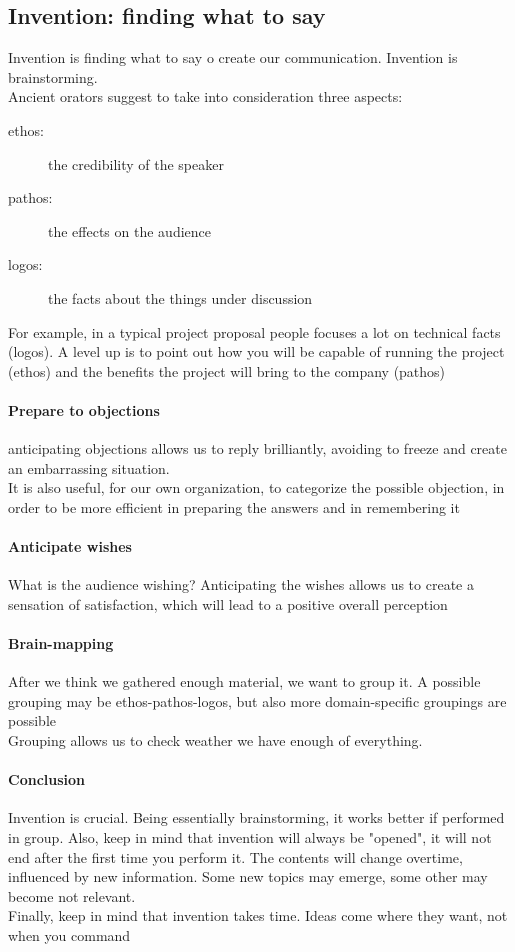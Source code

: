 \documentclass{article}
\begin{document}
\subsection{Invention: finding what to say}
Invention is finding what to say o create our communication. Invention is brainstorming.\\
Ancient orators suggest to take into consideration three aspects:
\begin{description}
\item[ethos:] the credibility of the speaker
\item[pathos:] the effects on the audience
\item[logos:] the facts about the things under discussion
\end{description}
For example, in a typical project proposal people focuses a lot on technical facts (logos). A level up is to point out how you will be capable of running the project (ethos) and the benefits the project will bring to the company (pathos)
\paragraph{Prepare to objections} anticipating objections allows us to reply brilliantly, avoiding to freeze and create an embarrassing situation.\\
It is also useful, for our own organization, to categorize the possible objection, in order to be more efficient in preparing the answers and in remembering it
\paragraph{Anticipate wishes} What is the audience wishing? Anticipating the wishes allows us to create a sensation of satisfaction, which will lead to a positive overall perception
\paragraph{Brain-mapping} After we think we gathered enough material, we want to group it. A possible grouping may be ethos-pathos-logos, but also more domain-specific groupings are possible\\
Grouping allows us to check weather we have enough of everything.
\paragraph{Conclusion} Invention is crucial. Being essentially brainstorming, it works better if performed in group. Also, keep in mind that invention will always be "opened", it will not end after the first time you perform it. The contents will change overtime, influenced by new information. Some new topics may emerge, some other may become not relevant.\\
Finally, keep in mind that invention takes time. Ideas come where they want, not when you command
\end{document}
